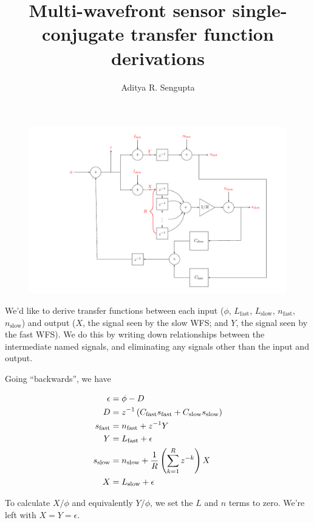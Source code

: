 \documentclass{article}
\title{Multi-wavefront sensor single-conjugate transfer function derivations}
\author{Aditya R. Sengupta}
\begin{document}
    \maketitle
    \begin{figure}[h]
        \includegraphics[width=\textwidth]{blockdiag_full.pdf}
    \end{figure}

    We'd like to derive transfer functions between each input ($\phi$, $L_{\text{fast}}$, $L_{\text{slow}}$, $n_{\text{fast}}$, $n_{\text{slow}}$) and output ($X$, the signal seen by the slow WFS; and $Y$, the signal seen by the fast WFS). We do this by writing down relationships between the intermediate named signals, and eliminating any signals other than the input and output.

    Going ``backwards'', we have

    \begin{align*}
        \epsilon &= \phi - D \\
        D &= z^{-1} \left(C_{\text{fast}} s_{\text{fast}} + C_{\text{slow}} s_{\text{slow}}\right) \\
        s_{\text{fast}} &= n_{\text{fast}} + z^{-1} Y \\
        Y &= L_{\text{fast}} + \epsilon \\
        s_{\text{slow}} &= n_{\text{slow}} + \frac{1}{R} \left(\sum_{k=1}^R z^{-k}\right) X \\
        X &= L_{\text{slow}} + \epsilon \\
    \end{align*}

    To calculate $X/\phi$ and equivalently $Y/\phi$, we set the $L$ and $n$ terms to zero. We're left with $X = Y = \epsilon$.
\end{document}
